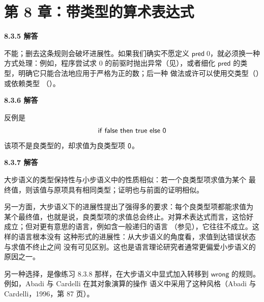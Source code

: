 \section{第 8 章：带类型的算术表达式}

\begin{taplauthorsolutionentrybox}
\label{sol:author:8.3.5}
\textbf{8.3.5 解答}

不能；删去这条规则会破坏进展性。如果我们确实不愿定义
\(\mathsf{pred}\;0\)，就必须换一种方式处理：例如，程序尝试求
\(0\) 的前驱时抛出异常（见），或者细化
\(\mathsf{pred}\) 的类型，明确它只能合法地应用于严格为正的数；后一种
做法或许可以使用交类型（）或依赖类型
（）。

\end{taplauthorsolutionentrybox}

\begin{taplauthorsolutionentrybox}
\label{sol:author:8.3.6}
\textbf{8.3.6 解答}

反例是
\[
  \mathsf{if}\ \mathsf{false}\ \mathsf{then}\ \mathsf{true}\ \mathsf{else}\ \mathsf{0}
\]
该项不是良类型的，却求值为良类型项 \(\mathsf{0}\)。

\end{taplauthorsolutionentrybox}

\begin{taplauthorsolutionentrybox}
\label{sol:author:8.3.7}
\textbf{8.3.7 解答}

大步语义的类型保持性与小步语义中的性质相似：若一个良类型项求值为某个
最终值，则该值与原项具有相同类型；证明也与前面的证明相似。

另一方面，大步语义下的进展性提出了强得多的要求：每个良类型项都能求值为
某个最终值，也就是说，良类型项的求值总会终止。对算术表达式而言，这恰好
成立；但对更有意思的语言，例如含一般递归的语言
（参见），它往往不成立。这样的语言根本没有
这种形式的进展性：从大步语义的角度看，求值到达错误状态与求值不终止之间
没有可见区别。这也是语言理论研究者通常更偏爱小步语义的原因之一。

另一种选择，是像练习 8.3.8 那样，在大步语义中显式加入转移到
\(\mathsf{wrong}\) 的规则。例如，Abadi 与 Cardelli 在其对象演算的操作
语义中采用了这种风格（Abadi 与 Cardelli，1996，第 87 页）。

\end{taplauthorsolutionentrybox}


